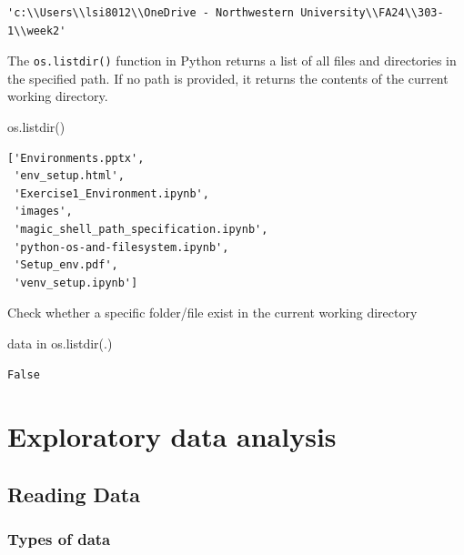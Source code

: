 \documentclass[
  letterpaper,
  DIV=11,
  numbers=noendperiod]{scrreprt}
\newenvironment{Shaded}{\begin{snugshade}}{\end{snugshade}}
\newcommand{\CommentTok}[1]{\textcolor[rgb]{0.37,0.37,0.37}{#1}}
\newcommand{\KeywordTok}[1]{\textcolor[rgb]{0.00,0.23,0.31}{#1}}
\newcommand{\NormalTok}[1]{\textcolor[rgb]{0.00,0.23,0.31}{#1}}
\newcommand{\StringTok}[1]{\textcolor[rgb]{0.13,0.47,0.30}{#1}}
\begin{document}
\begin{verbatim}
'c:\\Users\\lsi8012\\OneDrive - Northwestern University\\FA24\\303-1\\week2'
\end{verbatim}

The \texttt{os.listdir()} function in Python returns a list of all files
and directories in the specified path. If no path is provided, it
returns the contents of the current working directory.

\begin{Shaded}
\begin{Highlighting}[]
\NormalTok{os.listdir()}
\end{Highlighting}
\end{Shaded}

\begin{verbatim}
['Environments.pptx',
 'env_setup.html',
 'Exercise1_Environment.ipynb',
 'images',
 'magic_shell_path_specification.ipynb',
 'python-os-and-filesystem.ipynb',
 'Setup_env.pdf',
 'venv_setup.ipynb']
\end{verbatim}

Check whether a specific folder/file exist in the current working
directory

\begin{Shaded}
\begin{Highlighting}[]
\CommentTok{\textquotesingle{}data\textquotesingle{}} \KeywordTok{in}\NormalTok{ os.listdir(}\StringTok{\textquotesingle{}.\textquotesingle{}}\NormalTok{)}
\end{Highlighting}
\end{Shaded}

\begin{verbatim}
False
\end{verbatim}

\part{Exploratory data analysis}

\hypertarget{reading-data}{%
\chapter{Reading Data}\label{reading-data}}

\hypertarget{types-of-data}{%
\section{Types of data}\label{types-of-data}}
\end{document}
